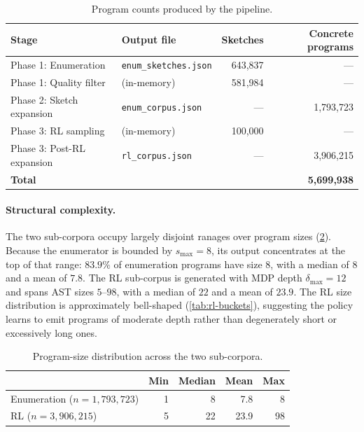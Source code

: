 \documentclass[12pt]{article}
\begin{document}
\begin{table}[!htbp]
\centering
\caption{Program counts produced by the pipeline.}
\label{tab:pipeline-stages}
\begin{tabular}{llrr}
\toprule
Stage & Output file & Sketches & Concrete programs \\
\midrule
Phase 1: Enumeration          & \texttt{enum\_sketches.json}  & 643{,}837 & --- \\
Phase 1: Quality filter       & (in-memory)                   & 581{,}984 & --- \\
Phase 2: Sketch expansion     & \texttt{enum\_corpus.json}    & ---       & 1{,}793{,}723 \\
Phase 3: RL sampling          & (in-memory)                   & 100{,}000 & --- \\
Phase 3: Post-RL expansion    & \texttt{rl\_corpus.json}      & ---       & 3{,}906{,}215 \\
\midrule
\textbf{Total}                &                               &           & \textbf{5{,}699{,}938} \\
\bottomrule
\end{tabular}
\end{table}

\paragraph{Structural complexity.} The two sub-corpora occupy largely disjoint ranages over program sizes (\cref{tab:size-dist}). Because the enumerator is bounded by $s_{\max} = 8$, its output concentrates at the top of that range: $83.9\%$ of enumeration programs have size $8$, with a median of $8$ and a mean of $7.8$. The RL sub-corpus is generated with MDP depth $\delta_{\max} = 12$ and spans AST sizes $5$--$98$, with a median of $22$ and a mean of $23.9$. The RL size distribution is approximately bell-shaped (\cref{tab:rl-buckets}), suggesting the policy learns to emit programs of moderate depth rather than degenerately short or excessively long ones.

\begin{table}[!htbp]
\centering
\caption{Program-size distribution across the two sub-corpora.}
\label{tab:size-dist}
\begin{tabular}{lrrrr}
\toprule
 & Min & Median & Mean & Max \\
\midrule
Enumeration ($n = 1{,}793{,}723$) & 1 & 8  & 7.8  & 8 \\
RL ($n = 3{,}906{,}215$)          & 5 & 22 & 23.9 & 98 \\
\bottomrule
\end{tabular}
\end{table}
\end{document}
